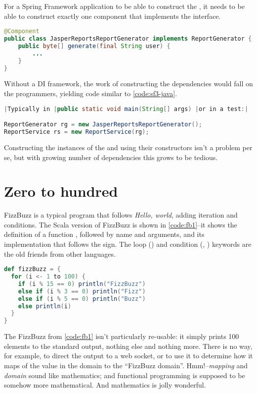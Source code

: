 \documentclass[10 pt]{article}
\begin{document}
For a Spring Framework application to be able to construct the , it needs to be able to construct exactly one component that implements the  interface.

\begin{lstlisting}[caption={Components}, label={code:sf2-java}, language=Java, escapechar=|]
@Component
public class JasperReportsReportGenerator implements ReportGenerator {
    public byte[] generate(final String user) {
        ...
    }
}
\end{lstlisting}

Without a DI framework, the work of constructing the dependencies would fall on the programmers, yielding code similar to \autoref{code:sf3-java}.

\begin{lstlisting}[caption={Manual DI}, label={code:sf3-java}, language=Java, escapechar=|]
|Typically in |public static void main(String[] args) |or in a test:|

ReportGenerator rg = new JasperReportsReportGenerator();
ReportService rs = new ReportService(rg);
\end{lstlisting}

Constructing the instances of the  and  using their constructors isn't a problem per se, but with growing number of dependencies this grows to be tedious.


\section{Zero to hundred}
FizzBuzz is a typical program that follows \emph{Hello, world}, adding iteration and conditions. The Scala version of FizzBuzz is shown in \autoref{code:fb1}--it shows the definition of a function , followed by name and arguments, and its implementation that follows the \pcode{=} sign. The loop () and condition (, ) keywords are the old friends from other languages. 

\begin{lstlisting}[caption={Fizz Buzz}, label={code:fb1}, language=Scala, escapechar=|]
def fizzBuzz = {
  for (i <- 1 to 100) {
    if (i % 15 == 0) println("FizzBuzz")
    else if (i % 3 == 0) println("Fizz")
    else if (i % 5 == 0) println("Buzz")
    else println(i)
  }
}
\end{lstlisting}

The FizzBuzz from \autoref{code:fb1} isn't particularly re-usable: it simply prints 100 elements to the standard output, nothing else and nothing more. There is no way, for example, to direct the output to a web socket, or to use it to determine how it maps of the value in the  domain to the ``FizzBuzz domain''. Hmm!--\emph{mapping} and \emph{domain} sound like mathematics; and functional programming is supposed to be somehow more mathematical. And mathematics is jolly wonderful. 
\end{document}
